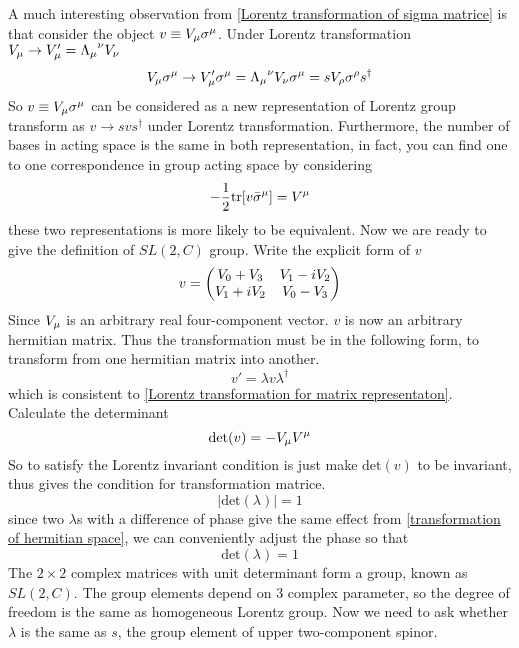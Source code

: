 A much interesting observation from \eqref{Lorentz transformation of sigma matrice} is that consider the object $v\equiv V_\mu \sigma^{\mu}$. Under Lorentz transformation
$V_{\mu}\rightarrow V'_{\mu} = {\Lambda_\mu}^\nu V_\nu$
\begin{equation} \label{Lorentz transformation for matrix representaton}
  V_{\mu}\sigma^{\mu} \rightarrow V'_{\mu}\sigma^{\mu} = {\Lambda_\mu}^\nu V_\nu\sigma^{\mu}=
  s V_{\rho}\sigma^{\rho}{s}^{\dagger}
\end{equation}
So $v\equiv V_\mu \sigma^{\mu}$ can be considered as a new representation of Lorentz group transform as $v\rightarrow s v s^{\dagger}$ under Lorentz transformation. 
Furthermore, the number of bases in acting space is the same in both representation, in fact, you can find one to one correspondence in group acting space by considering
\begin{equation} \label{reflection to the vector representation}
-\frac{1}{2} \text{tr}[v\bar{\sigma}^{\mu}] = V^{\mu}
\end{equation}
these two representations is more likely to be equivalent.
Now we are ready to give the definition of $SL(2,C)$ group. Write the explicit form of $v$
\begin{equation}
  v = \mqty(V_0 +  V_3 & V_1 - i V_2
                \\ V_1 +i V_2 & V_0 -  V_3)
\end{equation}
Since $V_{\mu}$ is an arbitrary real four-component vector.  $v$ is now an arbitrary hermitian matrix. Thus the transformation must be in the following form, to transform from one hermitian matrix into another.
\begin{equation} \label{transformation of hermitian space}
v' = \lambda v \lambda^{\dagger}
\end{equation}
which is consistent to \eqref{Lorentz transformation for matrix representaton}. Calculate the determinant
\begin{equation}
  \text{det}(v) = -V_\mu V^\mu
\end{equation}
So to satisfy the Lorentz invariant condition is just make $\text{det}(v)$ to be invariant, thus gives the condition for transformation matrice.
\begin{equation}
  |\text{det}(\lambda)| = 1
\end{equation}
since two $\lambda$s with a difference of phase give the same effect from \eqref{transformation of hermitian space}, we can conveniently adjust the phase so that
\begin{equation} \label{SL(2,C) condition}
\text{det}(\lambda) = 1
\end{equation}
The $2\times2$ complex matrices with unit determinant form a group, known as \textbf{$SL(2,C)$}. The group elements depend on 3 complex parameter, so the degree of freedom is the same as homogeneous Lorentz group. Now we need to ask whether $\lambda$ is the same as $s$, the group element of upper two-component spinor.

